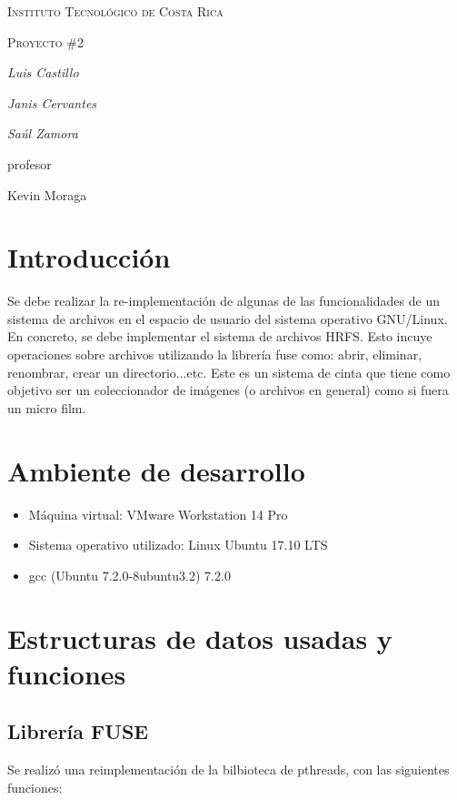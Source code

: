 \documentclass{article}
\begin{document}
\begin{titlepage}
  \centering
  {\scshape\LARGE Instituto Tecnol\'ogico de Costa Rica \par}
  \vspace{1cm}
  {\scshape\Large Proyecto \#2\par}
  \vspace{1.5cm}
  {\Large\itshape Luis Castillo\par}
  {\Large\itshape Janis Cervantes\par}
  {\Large\itshape Sa\'ul Zamora\par}
  \vfill
  profesor\par
  Kevin Moraga \textsc{}

  \vfill

\end{titlepage}

\section{Introducci\'on}
Se debe realizar la re-implementaci\'on de algunas de las funcionalidades de un sistema de archivos en el espacio de usuario del sistema operativo GNU/Linux. En concreto, se debe implementar el sistema de archivos HRFS. Esto incuye operaciones sobre archivos utilizando la librería fuse como: abrir, eliminar, renombrar, crear un directorio...etc. Este es un sistema de cinta que tiene como objetivo ser un coleccionador de im\'agenes (o archivos en general) como si fuera un micro film.

\section{Ambiente de desarrollo}
\begin{itemize}
  \item M\'aquina virtual: VMware Workstation 14 Pro
  \item Sistema operativo utilizado: Linux Ubuntu 17.10 LTS
  \item gcc (Ubuntu 7.2.0-8ubuntu3.2) 7.2.0
\end{itemize}

\section{Estructuras de datos usadas y funciones}
\subsection{Librer\'ia FUSE}
Se realiz\'o una reimplementaci\'on de la bilbioteca de pthreads, con las siguientes funciones:
\end{document}
